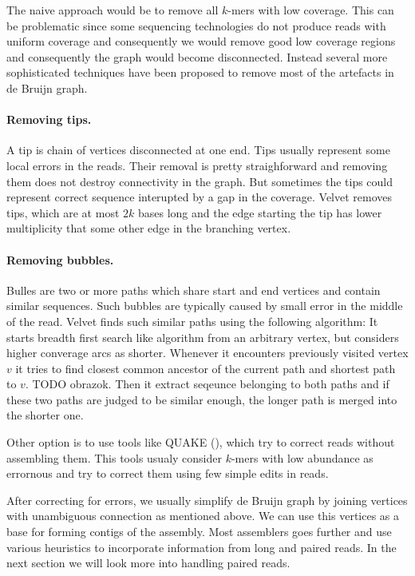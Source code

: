 The naive approach would be to remove all $k$-mers with low coverage.
This can be problematic since some sequencing technologies do not produce reads with uniform coverage
and consequently we would remove good low coverage regions and consequently the graph would become disconnected.
Instead several more sophisticated techniques have been proposed to remove
most of the artefacts in de Bruijn graph.

\paragraph{Removing tips.} A tip is chain of vertices disconnected at one end. 
Tips usually represent some local errors in the reads. Their removal is pretty straighforward
and removing them does not destroy connectivity in the graph. But sometimes the tips
could represent correct sequence interupted by a gap in the coverage.
Velvet \citep{Velvet} removes tips, which are at most $2k$ bases long and the edge starting
the tip has lower multiplicity that some other edge in the branching vertex.

\paragraph{Removing bubbles.} Bulles are two or more paths which share start and end vertices
and contain similar sequences.
Such bubbles are typically caused by small error in the middle of the read.
Velvet finds such similar paths using the following algorithm:
It starts breadth first search like algorithm from an arbitrary vertex, but considers higher converage
arcs as shorter. Whenever it encounters previously visited vertex $v$ it tries to find closest common ancestor
of the current path and shortest path to $v$. TODO obrazok. Then it extract seqeunce belonging to both paths and
if these two paths are judged to be similar enough, the longer path is merged into the shorter one. 
 
\bigskip

Other option is to use tools like QUAKE (\cite{Quake}), which try to correct reads
without assembling them. This tools usualy consider $k$-mers with low abundance
as errornous and try to correct them using few simple edits in reads.

After correcting for errors, we usually simplify de Bruijn graph by joining vertices
with unambiguous connection as mentioned above. 
We can use this vertices as a base for forming contigs of the assembly.
Most assemblers goes further and use various heuristics
to incorporate information from long and paired reads.
In the next section we will look more into handling paired reads.

